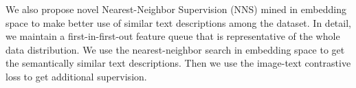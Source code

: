 \protect{} We also propose novel Nearest-Neighbor Supervision (NNS) mined in embedding space to make better use of similar text descriptions among the dataset.
In detail, we maintain a first-in-first-out feature queue that is representative of the whole data distribution. We use the nearest-neighbor search in embedding space to get the semantically similar text descriptions. Then we use the image-text contrastive loss to get additional supervision. 


    


